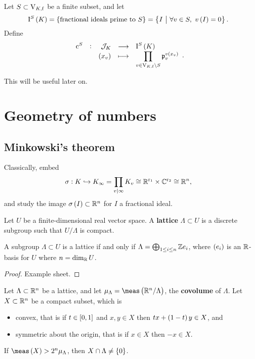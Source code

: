 \begin{definition*}
Let $ S \subset \mathrm{V}_{K, \mathrm{f}} $ be a finite subset, and let
$$ \I^S\br{K} = \cbr{\text{fractional ideals prime to} \ S} = \cbr{I \st \forall v \in S, \ v\br{I} = 0}. $$
Define
$$ \function[\c^S]{\JJJ_K}{\I^S\br{K}}{\br{x_v}}{\prod_{v \in \V_{K, \f} \setminus S} \ppp_v^{v\br{x_v}}}. $$
\end{definition*}

This will be useful later on.

\pagebreak

\section{Geometry of numbers}

\subsection{Minkowski's theorem}

Classically, embed
$$ \sigma : K \hookrightarrow K_\infty = \prod_{v \mid \infty} K_v \cong \mathbb{R}^{\mathrm{r}_1} \times \mathbb{C}^{\mathrm{r}_2} \cong \mathbb{R}^n, $$
and study the image $ \sigma\br{I} \subset \RR^n $ for $ I $ a fractional ideal.

\begin{definition*}
Let $ U $ be a finite-dimensional real vector space. A \textbf{lattice} $ \Lambda \subset U $ is a discrete subgroup such that $ U / \Lambda $ is compact.
\end{definition*}

\begin{proposition}
A subgroup $ \Lambda \subset U $ is a lattice if and only if $ \Lambda = \bigoplus_{1 \le i \le n} \mathbb{Z} e_i $, where $ \br{e_i} $ is an $ \mathbb{R} $-basis for $ U $ where $ n = \dim_{\mathbb{R}} U $.
\end{proposition}

\begin{proof}
Example sheet.
\end{proof}

\begin{theorem}
\label{thm:7.2}
Let $ \Lambda \subset \mathbb{R}^n $ be a lattice, and let $ \mu_\Lambda = \meas\br{\RR^n / \Lambda} $, the \textbf{covolume} of $ \Lambda $. Let $ X \subset \mathbb{R}^n $ be a compact subset, which is
\begin{itemize}
\item convex, that is if $ t \in \sbr{0, 1} $ and $ x, y \in X $ then $ tx + \br{1 - t}y \in X $, and
\item symmetric about the origin, that is if $ x \in X $ then $ -x \in X $.
\end{itemize}
If $ \meas\br{X} > 2^n\mu_\Lambda $, then $ X \cap \Lambda \ne \cbr{0} $.
\end{theorem}

